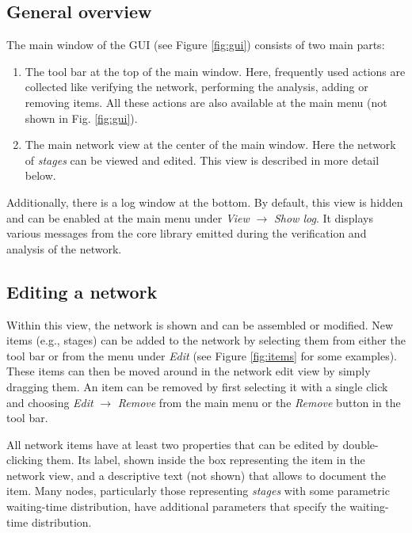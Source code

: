 \subsection{General overview}
The main window of the GUI (see Figure \ref{fig:gui}) consists of two main parts:
\begin{enumerate}
 \item The tool bar at the top of the main window. Here, frequently used actions are collected like verifying the network, performing the analysis,
 adding or removing items. All these actions are also available at the main menu (not shown in Fig. \ref{fig:gui}).
 \item The main network view at the center of the main window. Here the network of \emph{stages} can be viewed and edited. This view is described in more detail below.
\end{enumerate}

Additionally, there  is a log window at the bottom. By default, this view is hidden and can be enabled at the main menu under \emph{View} $\rightarrow$ \emph{Show log}. It displays various messages from the core library emitted during the verification and analysis of the network. 


\subsection{Editing a network}
Within this view, the network is shown and can be assembled or modified. New items (e.g., stages) can be added to the network by selecting them from either the tool bar or from the menu under \emph{Edit} (see Figure \ref{fig:items} for some examples). These items can then be moved around in the network edit view by simply dragging them. An item can be removed by first selecting it with a single click and choosing \emph{Edit} $\rightarrow$ \emph{Remove} from the main menu or the \emph{Remove} button in the tool bar.

All network items have at least two properties that can be edited by double-clicking them. Its label, shown inside the box representing the item in the network view, and a descriptive text (not shown) that allows to document the item. Many nodes, particularly those representing \emph{stages} with some parametric waiting-time distribution, have additional parameters that specify the waiting-time distribution. 

